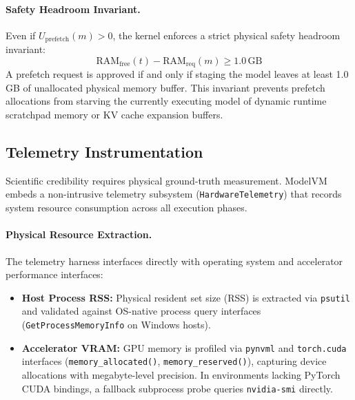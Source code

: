 \paragraph{Safety Headroom Invariant.}
Even if $U_{\text{prefetch}}(m) > 0$, the kernel enforces a strict physical safety headroom invariant:
\begin{equation}
\text{RAM}_{\text{free}}(t) - \text{RAM}_{\text{req}}(m) \ge 1.0\,\text{GB}
\end{equation}
A prefetch request is approved if and only if staging the model leaves at least 1.0\,GB of unallocated physical memory buffer. This invariant prevents prefetch allocations from starving the currently executing model of dynamic runtime scratchpad memory or KV cache expansion buffers.

\subsection{Telemetry Instrumentation}
\label{sec:telemetry_mechanics}

Scientific credibility requires physical ground-truth measurement. ModelVM embeds a non-intrusive telemetry subsystem (\texttt{HardwareTelemetry}) that records system resource consumption across all execution phases.

\paragraph{Physical Resource Extraction.}
The telemetry harness interfaces directly with operating system and accelerator performance interfaces:
\begin{itemize}
    \item \textbf{Host Process RSS:} Physical resident set size (RSS) is extracted via \texttt{psutil} and validated against OS-native process query interfaces (\texttt{GetProcessMemoryInfo} on Windows hosts).
    \item \textbf{Accelerator VRAM:} GPU memory is profiled via \texttt{pynvml} and \texttt{torch.cuda} interfaces (\texttt{memory\_allocated()}, \texttt{memory\_reserved()}), capturing device allocations with megabyte-level precision. In environments lacking PyTorch CUDA bindings, a fallback subprocess probe queries \texttt{nvidia-smi} directly.
\end{itemize}

